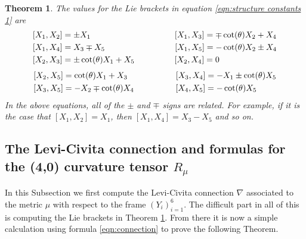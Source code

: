 \documentclass[10pt]{amsart}
\def\th{\theta}
\newtheorem{theorem}{Theorem}[section]
\theoremstyle{definition}
\theoremstyle{remark}
\numberwithin{equation}{section}
\begin{document}
\begin{theorem}\label{thm:Lie brackets 1}
The values for the Lie brackets in equation \eqref{eqn:structure constants 1} are
	\begin{align*}
	&[X_1,X_2] =  \pm X_1  		\hskip 101pt  	[X_1,X_3] =  \mp \cot(\th) X_2 + X_4  \\
	&[X_1,X_4] =  X_3 \mp X_5  	\hskip 84pt	[X_1,X_5] =  - \cot(\th) X_2 \pm X_4  \\
	&[X_2,X_3] =  \pm \cot(\th) X_1 + X_5  	\hskip 48pt	[X_2,X_4] =  0  
	\end{align*}
	\begin{align*}
	&[X_2,X_5] =  \cot(\th) X_1 + X_3  	\hskip 58pt	[X_3,X_4] =  -X_1 \pm \cot(\th) X_5  \\
	&[X_3,X_5] =  -X_2 \mp \cot(\th) X_4  	\hskip 50pt	[X_4,X_5] =  - \cot(\th) X_5
	\end{align*}
In the above equations, all of the $\pm$ and $\mp$ signs are related.  
For example, if it is the case that $[X_1,X_2] = X_1$, then $[X_1,X_4] = X_3 - X_5$ and so on.
\end{theorem}



\subsection{The Levi-Civita connection and formulas for the (4,0) curvature tensor $R_\mu$}
In this Subsection we first compute the Levi-Civita connection $\nabla$ associated to the metric $\mu$ with respect to the frame $(Y_i)_{i=1}^6$.  	
The difficult part in all of this is computing the Lie brackets in Theorem \ref{thm:Lie brackets 1}.
From there it is now a simple calculation using formula \eqref{eqn:connection} to prove the following Theorem.

\vskip 15pt
\end{document}
